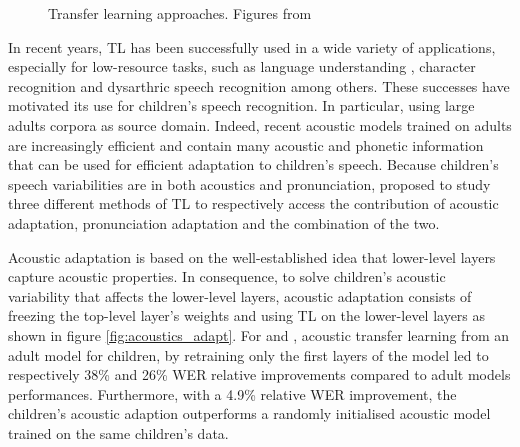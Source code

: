 \begin{figure}[t]
\centering
{}
\caption{Transfer learning approaches. Figures from \cite{TFchildren}}
\end{figure}

In recent years, TL has been successfully used in a wide variety of applications, especially for low-resource tasks, such as language understanding \cite{Bert}, character recognition \cite{tfcharacter} and dysarthric speech recognition \cite{tfpathology} among others. 
These successes have motivated its use for children's speech recognition. In particular, using large adults corpora as source domain. Indeed, recent acoustic models trained on adults are increasingly efficient and contain many acoustic and phonetic information that can be used for efficient adaptation to children's speech. Because children's speech variabilities are in both acoustics and pronunciation, \cite{TFchildren} proposed to study three different methods of TL to respectively access the contribution of acoustic adaptation, pronunciation adaptation and the combination of the two.

Acoustic adaptation is based on the well-established idea that lower-level layers capture acoustic properties. In consequence, to solve children's acoustic variability that affects the lower-level layers, acoustic adaptation consists of freezing the top-level layer's weights and using TL on the lower-level layers as shown in figure \ref{fig:acoustics_adapt}. For \cite{TFchildren} and \cite{TransferLF}, acoustic transfer learning from an adult model for children, by retraining only the first layers of the model led to respectively 38\% and 26\% WER relative improvements compared to adult models performances. Furthermore, with a 4.9\% relative WER improvement, the children's acoustic adaption outperforms a randomly initialised acoustic model trained on the same children's data.

